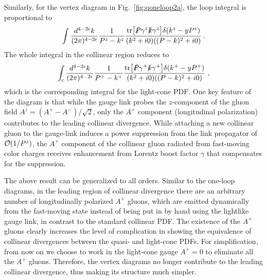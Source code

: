 \documentclass[aps,rmp,reprint,amsmath,amssymb,graphicx,longbibliography]{revtex4-1} %
\begin{document}
Similarly, for the vertex diagram in Fig.~\ref{fig:qoneloop2a}, the loop integral is proportional to
\begin{align}
	\int \frac{d^{4-2\epsilon}k}{(2\pi)^{4-2\epsilon}}\frac{1}{P^z-k^z}\frac{{\rm tr}\big[ \slashed{P} \gamma^z \slashed{k} \gamma^z\big] \delta(k^z-yP^z)}{(k^2+i0)((P-k)^2+i0)} \,.
\end{align}
The whole integral in the collinear region reduces to
\begin{align}
	\int_{\rm c} \frac{d^{4-2\epsilon}k}{(2\pi)^{4-2\epsilon}}\frac{1}{P^+-k^+}\frac{{\rm tr} \big[\slashed{P} \gamma^+ \slashed{k} \gamma^+\big]\delta(k^+-yP^+)}{(k^2+i0)((P-k)^2+i0)}  \ ,
\end{align}
which is the corresponding integral for the light-cone PDF. One key feature of the diagram is that while the gauge link probes the $z$-component of the gluon field $A^z =\left(A^+-A^-\right)/\sqrt{2}$, only the $A^+$ component (longitudinal polarization) contributes to the leading collinear divergence. While attaching a new collinear gluon to the gauge-link induces a power suppression from the link propagator of ${\cal O}(1/P^z)$, the $A^+$ component of the collinear gluon radiated from fast-moving color charges receives enhancement from Lorentz boost factor $\gamma$ that compensates for the suppression.

The above result can be generalized to all orders. Similar to the one-loop diagrams, in the leading region of collinear divergence there are an arbitrary number of longitudinally polarized $A^+$ gluons, which are emitted dynamically from the fast-moving state instead of being put in by hand using the lightlike gauge link, in contrast to the standard collinear PDF. The existence of the $A^+$ gluons clearly increases
the level of complication in showing the equivalence of collinear divergences between the quasi- and light-cone PDFs. For simplification, from now on we choose to work in the light-cone gauge $A^+=0$ to eliminate all the $A^+$ gluons. Therefore, the vertex diagrams
no longer contribute to the leading collinear divergence, thus making its structure much simpler.
\end{document}

